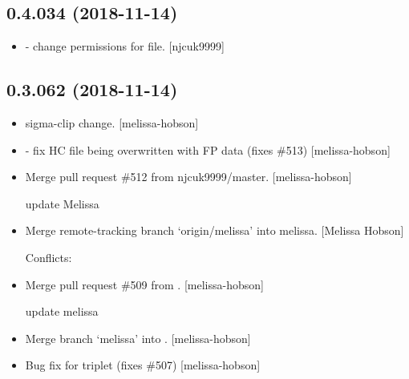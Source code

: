 \documentclass[a4paper,10pt,english]{report}
\begin{document}
\subsection{0.4.034 (2018-11-14)}
\label{\detokenize{misc/changelog:id261}}\begin{itemize}
\item {} 
 - change permissions for file. {[}njcuk9999{]}

\end{itemize}


\subsection{0.3.062 (2018-11-14)}
\label{\detokenize{misc/changelog:id262}}\begin{itemize}
\item {} 
 sigma-clip change. {[}melissa-hobson{]}

\item {} 
 - fix HC file being overwritten with FP data (fixes
\#513) {[}melissa-hobson{]}

\item {} 
Merge pull request \#512 from njcuk9999/master. {[}melissa-hobson{]}

update Melissa

\item {} 
Merge remote-tracking branch ‘origin/melissa’ into melissa. {[}Melissa
Hobson{]}
\begin{description}
\item[{Conflicts:}] \leavevmode
{}

\end{description}

\item {} 
Merge pull request \#509 from . {[}melissa-hobson{]}

update melissa

\item {} 
Merge branch ‘melissa’ into . {[}melissa-hobson{]}

\item {} 
Bug fix for  triplet (fixes \#507) {[}melissa-hobson{]}

\end{itemize}
\end{document}
